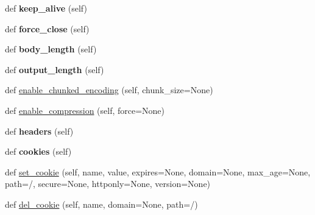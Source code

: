 \begin{DoxyCompactItemize}
\item 
\mbox{\label{classaiohttp_1_1web__response_1_1_stream_response_a10be11bda0d40793dcc63efd6482b97d}} 
def {\bfseries keep\+\_\+alive} (self)
\item 
\mbox{\label{classaiohttp_1_1web__response_1_1_stream_response_a1df8b04d8ad2a872d04eaf0b74bdd429}} 
def {\bfseries force\+\_\+close} (self)
\item 
\mbox{\label{classaiohttp_1_1web__response_1_1_stream_response_a420f553ac15da95742eb6467a4836771}} 
def {\bfseries body\+\_\+length} (self)
\item 
\mbox{\label{classaiohttp_1_1web__response_1_1_stream_response_a2f82e230ff7250ad84ec7febbc339594}} 
def {\bfseries output\+\_\+length} (self)
\item 
def \hyperlink{classaiohttp_1_1web__response_1_1_stream_response_af7ac24a8eb641a1f66ca6fe53c60dd2f}{enable\+\_\+chunked\+\_\+encoding} (self, chunk\+\_\+size=None)
\item 
def \hyperlink{classaiohttp_1_1web__response_1_1_stream_response_a9df561a10d3454f3315fce8d424a973c}{enable\+\_\+compression} (self, force=None)
\item 
\mbox{\label{classaiohttp_1_1web__response_1_1_stream_response_a7582dd066b4fed02eed89b68d12d4680}} 
def {\bfseries headers} (self)
\item 
\mbox{\label{classaiohttp_1_1web__response_1_1_stream_response_a7038e454167bc57b748c3e108d33d569}} 
def {\bfseries cookies} (self)
\item 
def \hyperlink{classaiohttp_1_1web__response_1_1_stream_response_a95383c88ac62c7dd147de095260f69ca}{set\+\_\+cookie} (self, name, value, expires=None, domain=None, max\+\_\+age=None, path=\textquotesingle{}/\textquotesingle{}, secure=None, httponly=None, version=None)
\item 
def \hyperlink{classaiohttp_1_1web__response_1_1_stream_response_acfb91366e954e97c1e839591ee328a29}{del\+\_\+cookie} (self, name, domain=None, path=\textquotesingle{}/\textquotesingle{})

\end{DoxyCompactItemize}
